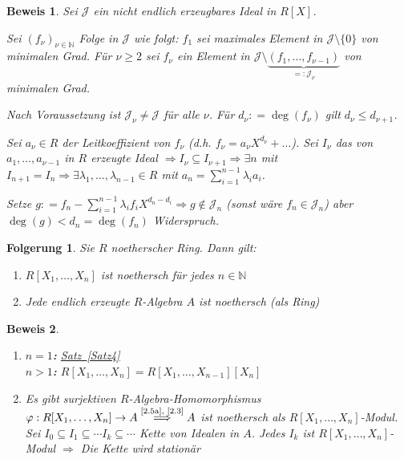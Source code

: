 \documentclass[a4paper,12pt]{scrbook}
\theoremstyle{break}
\newtheorem{Folg}[Def]{Folgerung}
\theoremstyle{nonumberbreak}
\newtheorem{Bew}{Beweis}
\theoremstyle{nonumberplain}
\newcommand{\defeqr}[0]{\mathrel{\mathop:}=}
\newcommand{\defeql}[0]{=\mathrel{\mathop:}}
\newcommand{\myref}[2]{%
\hyperref[#2]{#1~\ref*{#2}}%
}
\begin{document}
\begin{Bew} 
  Sei $\mathcal{J}$ ein nicht endlich erzeugbares Ideal in $R[X]$.

  Sei $(f_{\nu})_{\nu \in \mathbb{N}}$ Folge in $\mathcal{J}$ wie folgt:
  $f_1$ sei maximales Element in $\mathcal{J} \setminus \{0\}$ von minimalen
  Grad. Für $\nu \ge 2$ sei $f_{\nu}$ ein Element in $\mathcal{J} \setminus
  \underset{\defeql \mathcal{J}_{\nu}}{\underbrace{(f_1, \dots , f_{\nu - 1})}}$
  von minimalen Grad.

  Nach Voraussetzung ist $\mathcal{J}_{\nu} \not= \mathcal{J}$ für alle $\nu$.
  Für $d_{\nu} \defeqr \deg(f_{\nu})$ gilt $d_{\nu} \le d_{\nu + 1}$.

  Sei $a_{\nu} \in R$ der Leitkoeffizient von $f_{\nu}$ (d.h. $f_{\nu} =
  a_{\nu} X^{d_{\nu}} + \dots$). Sei $I_{\nu}$ das von $a_1, \dots , a_{\nu -1}$
  in $R$ erzeugte Ideal $\Rightarrow I_{\nu} \subseteq I_{\nu + 1} \Rightarrow
  \exists n$ mit $I_{n+1} = I_n \Rightarrow \exists \lambda_1, \dots ,
  \lambda_{n-1} \in R$ mit $a_n = \sum_{i=1}^{n-1} \lambda_i a_i$.

  Setze $g \defeqr f_n - \sum_{i=1}^{n-1} \lambda_i f_i X^{d_n - d_i}
  \Rightarrow g \notin \mathcal{J}_n$ (sonst wäre $f_n \in \mathcal{J}_n$) aber
  $\deg(g) < d_n = \deg(f_n)$ Widerspruch.
\end{Bew}

\begin{Folg} 
  Sie $R$ noetherscher Ring. Dann gilt:
  \begin{enumerate}
    \item \label{2.5a} $R[X_1, \dots , X_n]$ ist noethersch für jedes $n \in
    \mathbb{N}$
    \item Jede endlich erzeugte $R$-Algebra $A$ ist noethersch (als Ring)
  \end{enumerate}
\end{Folg}

\begin{Bew} 
  \begin{enumerate} 
    \item
      \textbf{$n=1$:} \myref{Satz}{Satz4}\\
      \textbf{$n>1$:} $R[X_1, \dots , X_n] = R[X_1, \dots , X_{n-1}][X_n]$
    \item Es gibt surjektiven $R$-Algebra-Homomorphismus $\varphi: R[X_1, \dots
      , X_n] \to A \overset{\text{\ref{2.5a}, \ref{2.3}}}{\Longrightarrow} A$ ist noethersch als $R[X_1, \dots ,
      X_n]$-Modul. Sei $I_0 \subseteq I_1 \subseteq \cdots I_k \subseteq
      \cdots$ Kette von Idealen in $A$. Jedes $I_k$ ist $R[X_1, \dots ,
      X_n]$-Modul $\Rightarrow$ Die Kette wird stationär
\end{enumerate}
\end{Bew}
\end{document}
